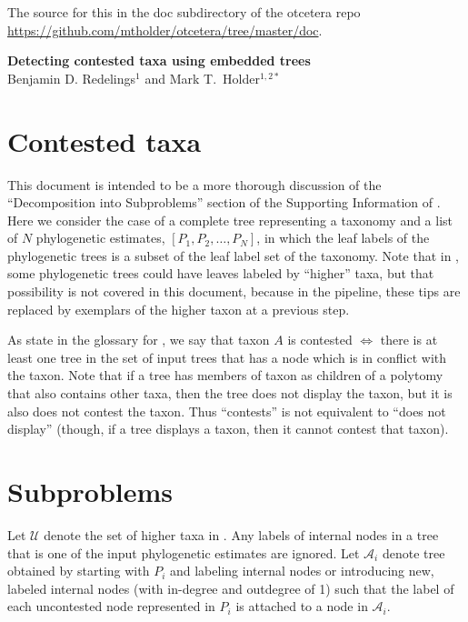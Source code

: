 \documentclass[11pt]{article}
\newcommand{\uncontestedTaxa}{\ensuremath{\mathcal{U}}\xspace}
\begin{document}
The source for this in the doc subdirectory of the otcetera
    repo \url{https://github.com/mtholder/otcetera/tree/master/doc}.
\begin{center}
    {\bf Detecting contested taxa using embedded trees} \\
{Benjamin D. Redelings$^{1}$ and Mark T.~Holder$^{1,2\ast}$}
\end{center}
\tableofcontents
\section{Contested taxa}
This document is intended to be a more thorough discussion of the
    ``Decomposition into Subproblems'' section of the Supporting
    Information of \citep{HinchliffEtAl2015}.
Here we consider the case of a complete tree representing a taxonomy \taxonomy and
    a list of $N$ phylogenetic estimates, $[P_1, P_2, \ldots, P_N]$, in which the leaf labels of the phylogenetic
    trees is a subset of the leaf label set of the taxonomy.
Note that in \citep{HinchliffEtAl2015}, some phylogenetic trees could have leaves labeled by
    ``higher'' taxa, but that possibility is not covered in this document, because in
    the \propinquity pipeline, these tips are replaced by exemplars of the higher taxon
    at a previous step.

As state in the glossary for \otc, we say that taxon $A$ is contested $\iff$ 
    there is at least one tree in the set of input trees that has a node which is in conflict
    with the taxon.
    Note that if a tree has members of taxon as children of a polytomy that also contains other taxa, then
        the tree does not display the taxon, but it is also does not contest the taxon.
    Thus ``contests'' is not equivalent to ``does not display'' (though, if a tree displays a taxon, then 
        it cannot contest that taxon).

\section{Subproblems}
Let $\uncontestedTaxa$ denote the set of higher taxa in \taxonomy.
Any labels of internal nodes in a tree that is one of the input phylogenetic estimates
    are ignored.
Let $\mathcal{A}_i$ denote tree obtained by starting with $P_i$ and labeling internal 
    nodes or introducing new, labeled internal nodes (with in-degree and outdegree of 1)
    such that the label of each uncontested node represented in $P_i$ is attached to a node
    in $\mathcal{A}_i$.


\end{document}
